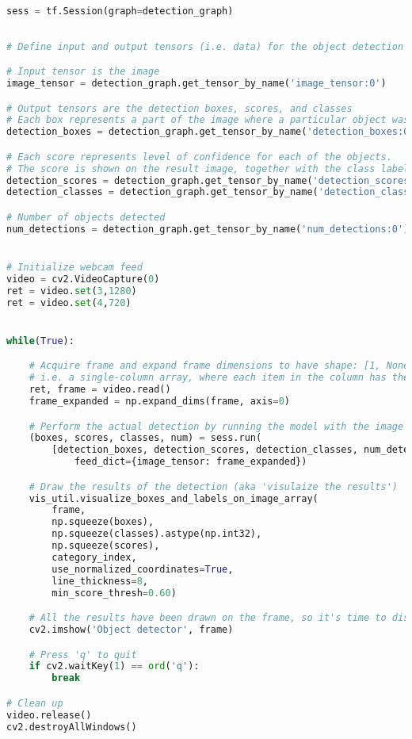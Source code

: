 \begin{appendices}
\begin{lstlisting}[language=Python, caption=Webcam Detection and Classification]
	sess = tf.Session(graph=detection_graph)
	
	
# Define input and output tensors (i.e. data) for the object detection classifier

# Input tensor is the image
image_tensor = detection_graph.get_tensor_by_name('image_tensor:0')

# Output tensors are the detection boxes, scores, and classes
# Each box represents a part of the image where a particular object was detected
detection_boxes = detection_graph.get_tensor_by_name('detection_boxes:0')

# Each score represents level of confidence for each of the objects.
# The score is shown on the result image, together with the class label.
detection_scores = detection_graph.get_tensor_by_name('detection_scores:0')
detection_classes = detection_graph.get_tensor_by_name('detection_classes:0')

# Number of objects detected
num_detections = detection_graph.get_tensor_by_name('num_detections:0')


# Initialize webcam feed
video = cv2.VideoCapture(0)
ret = video.set(3,1280)
ret = video.set(4,720)


while(True):

	# Acquire frame and expand frame dimensions to have shape: [1, None, None, 3]
	# i.e. a single-column array, where each item in the column has the pixel RGB value
	ret, frame = video.read()
	frame_expanded = np.expand_dims(frame, axis=0)

	# Perform the actual detection by running the model with the image as input
	(boxes, scores, classes, num) = sess.run(
		[detection_boxes, detection_scores, detection_classes, num_detections],
			feed_dict={image_tensor: frame_expanded})

	# Draw the results of the detection (aka 'visulaize the results')
	vis_util.visualize_boxes_and_labels_on_image_array(
		frame,
		np.squeeze(boxes),
		np.squeeze(classes).astype(np.int32),
		np.squeeze(scores),
		category_index,
		use_normalized_coordinates=True,
		line_thickness=8,
		min_score_thresh=0.60)

	# All the results have been drawn on the frame, so it's time to display it.
	cv2.imshow('Object detector', frame)

	# Press 'q' to quit
	if cv2.waitKey(1) == ord('q'):
		break

# Clean up
video.release()
cv2.destroyAllWindows()


\end{lstlisting}





\end{appendices}





